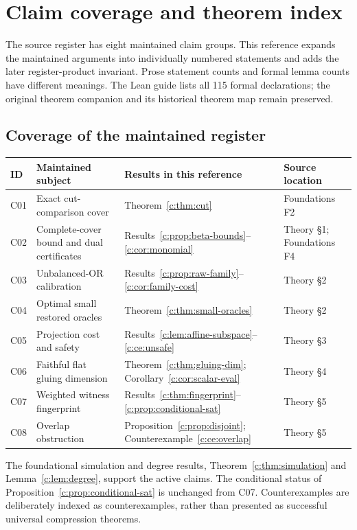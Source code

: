 
\chapter{Claim coverage and theorem index}
\label{c:app:index}
The source register has eight maintained claim groups. This reference expands the maintained arguments into individually numbered statements and adds the later register-product invariant. Prose statement counts and formal lemma counts have different meanings. The Lean guide lists all 115 formal declarations; the original theorem companion and its historical theorem map remain preserved.

\section{Coverage of the maintained register}
\small
\begin{longtable}{@{}>{\RaggedRight\arraybackslash}p{0.40in}>{\RaggedRight\arraybackslash}p{1.77in}>{\RaggedRight\arraybackslash}p{2.24in}>{\RaggedRight\arraybackslash}p{1.40in}@{}}
\toprule
\textbf{ID} & \textbf{Maintained subject} & \textbf{Results in this reference} & \textbf{Source location}\\\midrule\endhead
C01 & Exact cut-comparison cover & Theorem~\ref{c:thm:cut} & Foundations F2\\
C02 & Complete-cover bound and dual certificates & Results~\ref{c:prop:beta-bounds}--\ref{c:cor:monomial} & Theory \S1; Foundations F4\\
C03 & Unbalanced-OR calibration & Results~\ref{c:prop:raw-family}--\ref{c:cor:family-cost} & Theory \S2\\
C04 & Optimal small restored oracles & Theorem~\ref{c:thm:small-oracles} & Theory \S2\\
C05 & Projection cost and safety & Results~\ref{c:lem:affine-subspace}--\ref{c:ce:unsafe} & Theory \S3\\
C06 & Faithful flat gluing dimension & Theorem~\ref{c:thm:gluing-dim}; Corollary~\ref{c:cor:scalar-eval} & Theory \S4\\
C07 & Weighted witness fingerprint & Results~\ref{c:thm:fingerprint}--\ref{c:prop:conditional-sat} & Theory \S5\\
C08 & Overlap obstruction & Proposition~\ref{c:prop:disjoint}; Counterexample~\ref{c:ce:overlap} & Theory \S5\\
\bottomrule
\end{longtable}
\normalsize
The foundational simulation and degree results, Theorem~\ref{c:thm:simulation} and Lemma~\ref{c:lem:degree}, support the active claims. The conditional status of Proposition~\ref{c:prop:conditional-sat} is unchanged from C07. Counterexamples are deliberately indexed as counterexamples, rather than presented as successful universal compression theorems.

